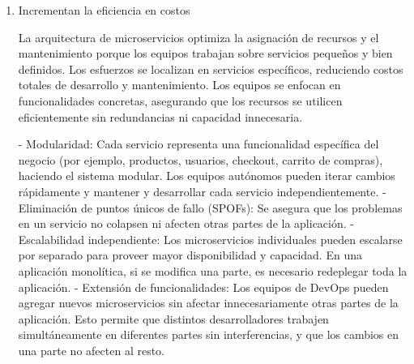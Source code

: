 \documentclass[12pt]{book}
\begin{document}
\begin{enumerate}
    \item Incrementan la eficiencia en costos

La arquitectura de microservicios optimiza la asignación de recursos y el mantenimiento porque los equipos trabajan sobre servicios pequeños y bien definidos. Los esfuerzos se localizan en servicios específicos, reduciendo costos totales de desarrollo y mantenimiento. 
Los equipos se enfocan en funcionalidades concretas, asegurando que los recursos se utilicen eficientemente sin redundancias ni capacidad innecesaria.

- Modularidad: Cada servicio representa una funcionalidad específica del negocio (por ejemplo, productos, usuarios, checkout, carrito de compras), haciendo el sistema modular. Los equipos autónomos pueden iterar cambios rápidamente y mantener y desarrollar cada servicio independientemente. 
- Eliminación de puntos únicos de fallo (SPOFs): Se asegura que los problemas en un servicio no colapsen ni afecten otras partes de la aplicación. 
- Escalabilidad independiente: Los microservicios individuales pueden escalarse por separado para proveer mayor disponibilidad y capacidad. En una aplicación monolítica, si se modifica una parte, es necesario redeplegar toda la aplicación. 
- Extensión de funcionalidades: Los equipos de DevOps pueden agregar nuevos microservicios sin afectar innecesariamente otras partes de la aplicación. Esto permite que distintos desarrolladores trabajen simultáneamente en diferentes partes sin interferencias, y que los cambios en una parte no afecten al resto.

\end{enumerate}
\end{document}
